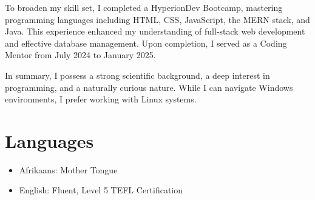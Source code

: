 \documentclass[a4paper,10pt]{article}
\begin{document}
To broaden my skill set, I completed a HyperionDev Bootcamp, mastering programming languages including HTML, CSS, JavaScript, the MERN stack, and Java. This experience enhanced my understanding of full-stack web development and effective database management. Upon completion, I served as a Coding Mentor from July 2024 to January 2025.

In summary, I possess a strong scientific background, a deep interest in programming, and a naturally curious nature. While I can navigate Windows environments, I prefer working with Linux systems.
\section*{Languages}
\begin{itemize}
	\item Afrikaans: Mother Tongue
	\item English: Fluent, Level 5 TEFL Certification
\end{itemize}
\end{document}
